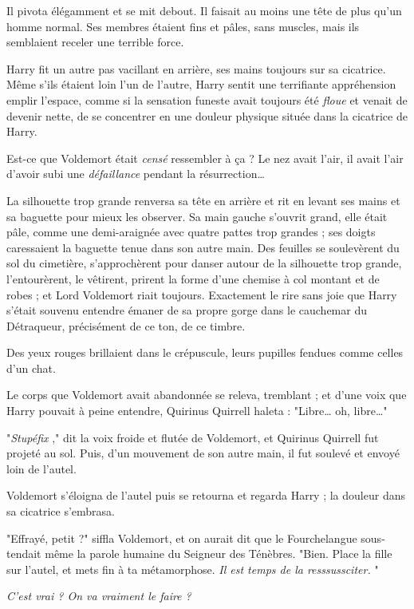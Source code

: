 Il pivota élégamment et se mit debout. Il faisait au moins une tête de plus qu'un homme normal. Ses membres étaient fins et pâles, sans muscles, mais ils semblaient receler une terrible force.

Harry fit un autre pas vacillant en arrière, ses mains toujours sur sa cicatrice. Même s'ils étaient loin l'un de l'autre, Harry sentit une terrifiante appréhension emplir l'espace, comme si la sensation funeste avait toujours été \emph{floue}  et venait de devenir nette, de se concentrer en une douleur physique située dans la cicatrice de Harry.

Est-ce que Voldemort était \emph{censé}  ressembler à ça ? Le nez avait l'air, il avait l'air d'avoir subi une \emph{défaillance}  pendant la résurrection…

La silhouette trop grande renversa sa tête en arrière et rit en levant ses mains et sa baguette pour mieux les observer. Sa main gauche s'ouvrit grand, elle était pâle, comme une demi-araignée avec quatre pattes trop grandes ; ses doigts caressaient la baguette tenue dans son autre main. Des feuilles se soulevèrent du sol du cimetière, s'approchèrent pour danser autour de la silhouette trop grande, l'entourèrent, le vêtirent, prirent la forme d'une chemise à col montant et de robes ; et Lord Voldemort riait toujours. Exactement le rire sans joie que Harry s'était souvenu entendre émaner de sa propre gorge dans le cauchemar du Détraqueur, précisément de ce ton, de ce timbre.

Des yeux rouges brillaient dans le crépuscule, leurs pupilles fendues comme celles d'un chat.

Le corps que Voldemort avait abandonnée se releva, tremblant ; et d'une voix que Harry pouvait à peine entendre, Quirinus Quirrell haleta : "Libre… oh, libre…"

"\emph{Stupéfix} ," dit la voix froide et flutée de Voldemort, et Quirinus Quirrell fut projeté au sol. Puis, d'un mouvement de son autre main, il fut soulevé et envoyé loin de l'autel.

Voldemort s'éloigna de l'autel puis se retourna et regarda Harry ; la douleur dans sa cicatrice s'embrasa.

"Effrayé, petit ?" siffla Voldemort, et on aurait dit que le Fourchelangue sous-tendait même la parole humaine du Seigneur des Ténèbres. "Bien. Place la fille sur l'autel, et mets fin à ta métamorphose. \emph{Il est temps de la resssussciter.} "

\emph{C'est vrai ? On va vraiment le faire ?} 

